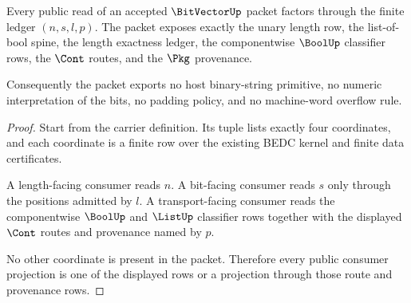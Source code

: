 \begin{theorem}\label{thm:bitvector-ledger-coverage}
Every public read of an accepted $\BitVectorUp$ packet factors through the
finite ledger $(n,s,l,p)$. The packet exposes exactly the unary length row, the
list-of-bool spine, the length exactness ledger, the componentwise $\BoolUp$
classifier rows, the $\Cont$ routes, and the $\Pkg$ provenance.

Consequently the packet exports no host binary-string primitive, no numeric
interpretation of the bits, no padding policy, and no machine-word overflow
rule.
\end{theorem}
\begin{proof}
Start from the carrier definition. Its tuple lists exactly four coordinates,
and each coordinate is a finite row over the existing BEDC kernel and finite
data certificates.

A length-facing consumer reads $n$. A bit-facing consumer reads $s$ only
through the positions admitted by $l$. A transport-facing consumer reads the
componentwise $\BoolUp$ and $\ListUp$ classifier rows together with the
displayed $\Cont$ routes and provenance named by $p$.

No other coordinate is present in the packet. Therefore every public consumer
projection is one of the displayed rows or a projection through those route and
provenance rows.
\end{proof}

